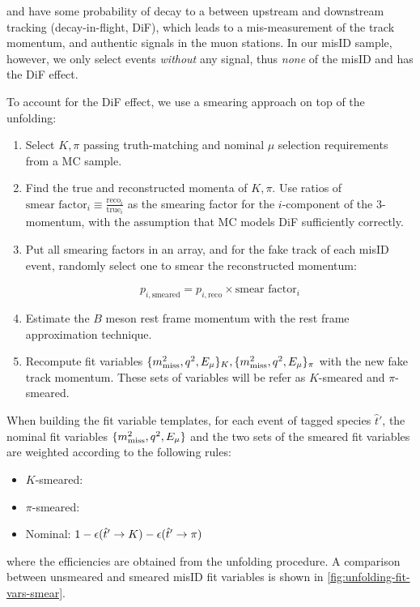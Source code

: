 \kaon and \pion have some probability of decay to a \muon between upstream and
downstream tracking (decay-in-flight, DiF),
which leads to a mis-measurement of the track momentum,
and authentic signals in the muon stations.
In our misID sample, however, we only select events \emph{without} any \muon
signal, thus \emph{none} of the misID \kaon and \pion has the DiF effect.

To account for the DiF effect, we use a smearing approach on top of the
unfolding:

\begin{enumerate}
    \item Select $K, \pi$ passing truth-matching and nominal $\mu$ selection
        requirements from a MC sample.

    \item Find the true and reconstructed momenta of
        $K, \pi$.
        Use ratios of
        $\text{smear factor}_i \equiv \frac{\text{reco}_i}{\text{true}_i}$
        as the smearing factor for the $i$-component of the 3-momentum,
        with the assumption that MC models DiF sufficiently correctly.

    \item Put all smearing factors in an array,
        and for the fake \muon track of each misID event,
        randomly select one to smear the reconstructed momentum:

        \begin{equation}
            p_{i,\text{smeared}} =
                p_{i,\text{reco}} \times \text{smear factor}_i
        \end{equation}

    \item Estimate the $B$ meson rest frame momentum with the rest frame
        approximation technique. %
    \item Recompute fit variables
        $\{\mmSq, \qSq, \el\}_K, \{\mmSq, \qSq, \el\}_\pi$
        with the new fake \muon track momentum.
        These sets of variables will be refer as $K$-smeared and $\pi$-smeared.
\end{enumerate}

When building the fit variable templates, for each event of tagged species
$\hat{t}'$,
the nominal fit variables $\{\mmSq, \qSq, \el\}$ and the two sets of the smeared
fit variables are weighted according to the following rules:

\begin{itemize}
    \item $K$-smeared: 
    \item $\pi$-smeared: \misEff[\hat{t}']{\pi}
    \item Nominal: $1 - \misEff[\hat{t}']{K} - \misEff[\hat{t}']{\pi}$
\end{itemize}
where the efficiencies are obtained from the unfolding procedure.
A comparison between unsmeared and smeared misID fit variables is shown
in \cref{fig:unfolding-fit-vars-smear}.

